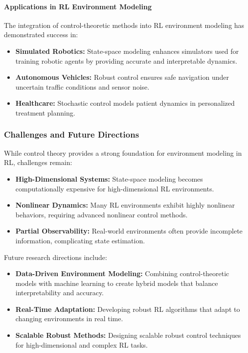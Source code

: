 \documentclass{IEEEojcsys}
\begin{document}
\paragraph{Applications in RL Environment Modeling}
The integration of control-theoretic methods into RL environment modeling has demonstrated success in:
\begin{itemize}
    \item \textbf{Simulated Robotics:} State-space modeling enhances simulators used for training robotic agents by providing accurate and interpretable dynamics.
    \item \textbf{Autonomous Vehicles:} Robust control ensures safe navigation under uncertain traffic conditions and sensor noise.
    \item \textbf{Healthcare:} Stochastic control models patient dynamics in personalized treatment planning.
\end{itemize}

\subsubsection{Challenges and Future Directions}
While control theory provides a strong foundation for environment modeling in RL, challenges remain:
\begin{itemize}
    \item \textbf{High-Dimensional Systems:} State-space modeling becomes computationally expensive for high-dimensional RL environments.
    \item \textbf{Nonlinear Dynamics:} Many RL environments exhibit highly nonlinear behaviors, requiring advanced nonlinear control methods.
    \item \textbf{Partial Observability:} Real-world environments often provide incomplete information, complicating state estimation.
\end{itemize}

Future research directions include:
\begin{itemize}
    \item \textbf{Data-Driven Environment Modeling:} Combining control-theoretic models with machine learning to create hybrid models that balance interpretability and accuracy.
    \item \textbf{Real-Time Adaptation:} Developing robust RL algorithms that adapt to changing environments in real time.
    \item \textbf{Scalable Robust Methods:} Designing scalable robust control techniques for high-dimensional and complex RL tasks.
\end{itemize}
\end{document}

